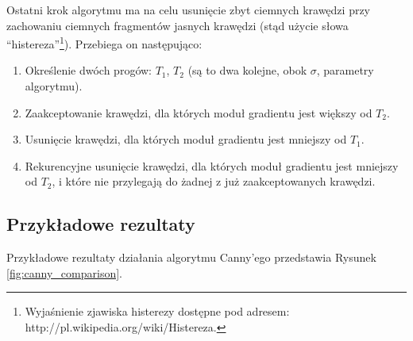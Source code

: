 \documentclass[a4paper,twocolumn,12pt]{article}
\begin{document}
Ostatni krok algorytmu ma na celu usunięcie zbyt ciemnych krawędzi przy zachowaniu ciemnych fragmentów jasnych krawędzi (stąd użycie słowa ``histereza''\footnote{Wyjaśnienie zjawiska histerezy dostępne pod adresem: http://pl.wikipedia.org/wiki/Histereza.}).
Przebiega on następująco:

\begin{enumerate}
 \item Określenie dwóch progów: $T_1$, $T_2$ (są to dwa kolejne, obok $\sigma$, parametry algorytmu).
 \item Zaakceptowanie krawędzi, dla których moduł gradientu jest większy od $T_2$.
 \item Usunięcie krawędzi, dla których moduł gradientu jest mniejszy od $T_1$.
 \item Rekurencyjne usunięcie krawędzi, dla których moduł gradientu jest mniejszy od $T_2$, i które nie przylegają do żadnej z już zaakceptowanych krawędzi.
\end{enumerate}


\subsection{Przykładowe rezultaty}

Przykładowe rezultaty działania algorytmu Canny'ego przedstawia Rysunek \ref{fig:canny_comparison}.
\end{document}
